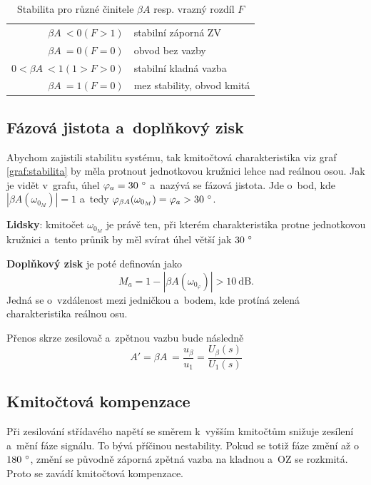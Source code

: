 \documentclass[a4paper,12pt]{article}   %
\begin{document}
\begin{table}[h!]
    \centering
    \begin{tabular}{rl}
        $\beta A~< 0 (F>1)$ & stabilní záporná ZV\\
        $\beta A~= 0 (F=0)$ & obvod bez vazby \\
        $0 < \beta A~< 1(1>F>0)$&stabilní kladná vazba\\
        $\beta A~= 1 (F=0)$ & mez stability, obvod kmitá\\
    \end{tabular}
    \caption{Stabilita pro různé činitele $\beta A$ resp. vrazný rozdíl $F$}
    \label{tab:stabilita}
\end{table}

\subsection*{Fázová jistota a~doplňkový zisk}
Abychom zajistili stabilitu systému, tak kmitočtová charakteristika viz graf \ref{graf:stabilita} by měla protnout jednotkovou kružnici lehce nad reálnou osou. Jak je vidět v~grafu, úhel $\varphi_a = 30~\degree$ a~nazývá se fázová jistota. Jde o~bod, kde $|\beta A(\omega_{0_M})| = 1$ a~tedy $\varphi_{\beta A}(\omega_{0_M}) = \varphi_a > 30~\degree$.

\textbf{Lidsky}: kmitočet $\omega_{0_M}$ je právě ten, při kterém charakteristika protne jednotkovou kružnici a~tento průnik by měl svírat úhel větší jak $30~\degree$

\textbf{Doplňkový zisk} je poté definován jako
\begin{equation*}
    M_a = 1-|\beta A(\omega_{0_\varphi})| > 10~\text{dB}.
\end{equation*}
Jedná se o~vzdálenost mezi jedničkou a~bodem, kde protíná zelená charakteristika reálnou osu.

Přenos skrze zesilovač a~zpětnou vazbu bude následně
\begin{equation*}
    A' = \beta A~= \frac{u_\beta}{u_\text{1}} = \frac{U_\beta (s)}{U_\text{1}(s)}
\end{equation*}

\subsection*{Kmitočtová kompenzace}
Při zesilování střídavého napětí se směrem k~vyšším kmitočtům snižuje zesílení a~mění fáze signálu. To bývá příčinou nestability. Pokud se totiž fáze změní až o~$180~\degree$, změní se původně záporná zpětná vazba na kladnou a~OZ se rozkmitá. Proto se zavádí kmitočtová kompenzace.
\end{document}
